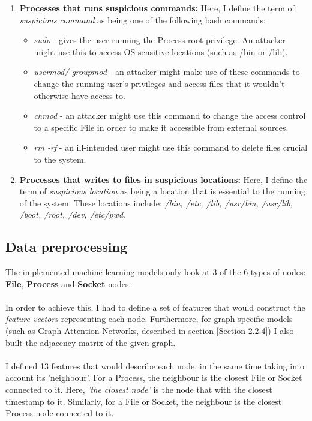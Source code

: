 \begin{enumerate}
		\item \textbf{Processes that runs suspicious commands: }Here, I define the term of \textit{suspicious command} as being one of the following bash commands:
		\begin{itemize}
			\item \textit{sudo} - gives the user running the Process root privilege. An attacker might use this to access OS-sensitive locations (such as /bin or /lib). 
			\item \textit{usermod/ groupmod} - an attacker might make use of these commands to change the running user's privileges and access files that it wouldn't otherwise have access to.
			\item \textit{chmod} - an attacker might use this command to change the access control to a specific File in order to make it accessible from external sources.
			\item \textit{rm -rf} - an ill-intended user might use this command to delete files crucial to the system. 
		\end{itemize}
	
		\item \textbf{Processes that writes to files in suspicious locations: }Here, I define the term of \textit{suspicious location} as being a location that is essential to the running of the system. These locations include:  \textit{/bin, /etc, /lib, /usr/bin, /usr/lib, /boot, /root, /dev, /etc/pwd}.
	\end{enumerate}
	\subsection{Data preprocessing}
	The implemented machine learning models only look at 3 of the 6 types of nodes: \textbf{File}, \textbf{Process} and \textbf{Socket} nodes. 
	\\ \\
	In order to achieve this, I had to define a set of features that would construct the \textit{feature vectors} representing each node. Furthermore, for graph-specific models (such as Graph Attention Networks, described in section \ref{Section 2.2.4})  I also built the adjacency matrix of the given graph. 
	\\ \\
	I defined 13 features that would describe each node, in the same time taking into account its 'neighbour'. For a Process, the neighbour is the closest File or Socket connected to it. Here, \textit{'the closest node'} is the node that with the closest timestamp to it. Similarly, for a File or Socket, the neighbour is the closest Process node connected to it.
		
